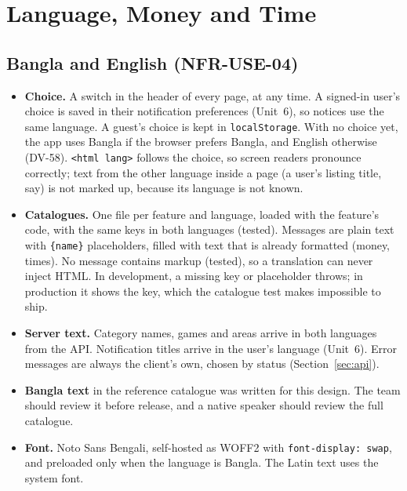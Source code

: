 \documentclass[11pt,a4paper]{article}
\begin{document}
\section{Language, Money and Time}
\label{sec:lang}

\subsection{Bangla and English (NFR-USE-04)}
\begin{itemize}[nosep]
  \item \textbf{Choice.} A switch in the header of every page, at any time. A signed-in user's choice is saved in their notification preferences (Unit~6), so notices use the same language. A guest's choice is kept in \texttt{localStorage}. With no choice yet, the app uses Bangla if the browser prefers Bangla, and English otherwise (DV-58). \texttt{<html lang>} follows the choice, so screen readers pronounce correctly; text from the other language inside a page (a user's listing title, say) is not marked up, because its language is not known.
  \item \textbf{Catalogues.} One file per feature and language, loaded with the feature's code, with the same keys in both languages (tested). Messages are plain text with \texttt{\{name\}} placeholders, filled with text that is already formatted (money, times). No message contains markup (tested), so a translation can never inject HTML. In development, a missing key or placeholder throws; in production it shows the key, which the catalogue test makes impossible to ship.
  \item \textbf{Server text.} Category names, games and areas arrive in both languages from the API. Notification titles arrive in the user's language (Unit~6). Error messages are always the client's own, chosen by status (Section~\ref{sec:api}).
  \item \textbf{Bangla text} in the reference catalogue was written for this design. The team should review it before release, and a native speaker should review the full catalogue.
  \item \textbf{Font.} Noto Sans Bengali, self-hosted as WOFF2 with \texttt{font-display: swap}, and preloaded only when the language is Bangla. The Latin text uses the system font.
\end{itemize}
\end{document}
